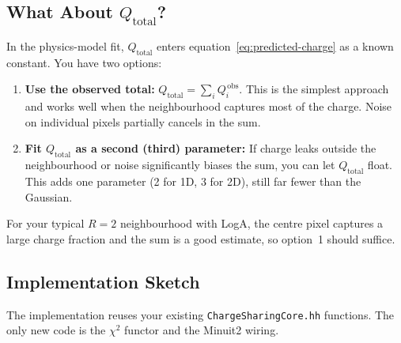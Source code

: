 \documentclass[11pt,a4paper]{article}
\newcommand{\code}[1]{\texttt{#1}}
\begin{document}
\subsection{What About $Q_{\text{total}}$?}
\label{sec:qtotal}

In the physics-model fit, $Q_{\text{total}}$ enters
equation~\eqref{eq:predicted-charge} as a known constant.  You have two
options:

\begin{enumerate}[nosep]
  \item \textbf{Use the observed total:}\quad
    $Q_{\text{total}} = \sum_i Q_i^{\,\text{obs}}$.  This is the
    simplest approach and works well when the neighbourhood captures most
    of the charge.  Noise on individual pixels partially cancels in the
    sum.
  \item \textbf{Fit $Q_{\text{total}}$ as a second (third) parameter:}\quad
    If charge leaks outside the neighbourhood or noise significantly
    biases the sum, you can let $Q_{\text{total}}$ float.  This adds one
    parameter (2 for 1D, 3 for 2D), still far fewer than the Gaussian.
\end{enumerate}

\noindent
For your typical $R = 2$ neighbourhood with LogA, the centre pixel
captures a large charge fraction and the sum is a good estimate, so
option~1 should suffice.

\subsection{Implementation Sketch}
\label{sec:implementation}

The implementation reuses your existing \code{ChargeSharingCore.hh}
functions.  The only new code is the $\chi^{2}$ functor and the Minuit2
wiring.
\end{document}
